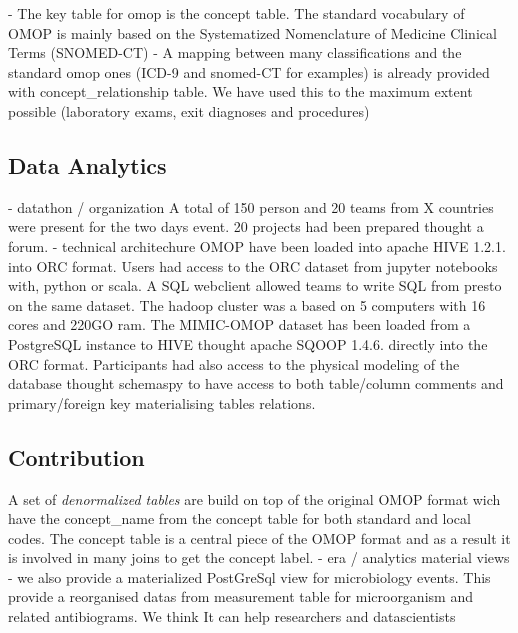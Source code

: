 - The key table for omop is the concept table. The standard vocabulary of OMOP
is mainly based on the Systematized Nomenclature of Medicine Clinical Terms
(SNOMED-CT)
- A mapping between many classifications and the standard omop ones (ICD-9 and
snomed-CT for examples) is already provided with concept_relationship table. We
have used this to the maximum extent possible (laboratory exams, exit diagnoses
and procedures)

\subsection{Data Analytics}
- datathon / organization
A total of 150 person and 20 teams from X countries were present for the two
days event. 20 projects had been prepared thought a forum.
- technical architechure
OMOP have been loaded into apache HIVE 1.2.1. into ORC format. Users had access
to the ORC dataset from jupyter notebooks with, python or scala. A SQL
webclient allowed teams to write SQL from presto on the same dataset. The
hadoop cluster was a based on 5 computers with 16 cores and 220GO ram.
The MIMIC-OMOP dataset has been loaded from a PostgreSQL instance to HIVE
thought apache SQOOP 1.4.6. directly into the ORC format. 
Participants had also access to the physical modeling of the database thought
schemaspy to have access to both table/column comments and primary/foreign key
materialising tables relations.
\subsection{Contribution}
A set of \emph{denormalized tables} are build on top of the original OMOP
format wich have the concept\_name from the concept table for both standard and
local codes. The concept table is a central piece of the OMOP format and as a
result it is involved in many joins to get the concept label. 
- era / analytics material views
	- we also provide a materialized PostGreSql view for microbiology events. This provide a reorganised datas from measurement table for microorganism and related antibiograms. We think It can help researchers and datascientists

